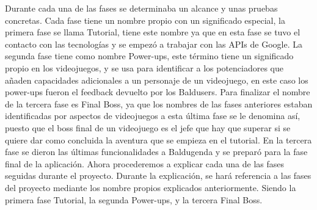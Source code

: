 Durante cada una de las fases se determinaba un alcance y unas pruebas concretas.
Cada fase tiene un nombre propio con un significado especial, la primera fase se llama Tutorial, tiene este nombre ya que en esta fase se tuvo el contacto con las tecnologías y se empezó a trabajar con las APIs de Google. La segunda fase tiene como nombre Power-ups, este término tiene un significado propio en los videojuegos,  y se usa para identificar a los potenciadores que añaden capacidades adicionales a un personaje de un  videojuego, en este caso los power-ups fueron el feedback devuelto por los Baldusers. Para finalizar el nombre de la tercera fase es  Final Boss, ya que los nombres de las fases anteriores estaban identificadas por aspectos de videojuegos a esta última fase se le denomina así, puesto que el boss final de un videojuego es el jefe que hay que superar si se quiere dar como concluida la aventura que se empieza en el tutorial. En la tercera fase se dieron las últimas funcionalidades a Baldugenda y se preparó para la fase final de la aplicación.
\newpage
Ahora procederemos a explicar cada una de las fases seguidas durante el proyecto. Durante la explicación, se hará referencia a las fases del proyecto mediante los nombre propios explicados anteriormente. Siendo la primera fase Tutorial, la segunda Power-ups, y la tercera Final Boss.  
